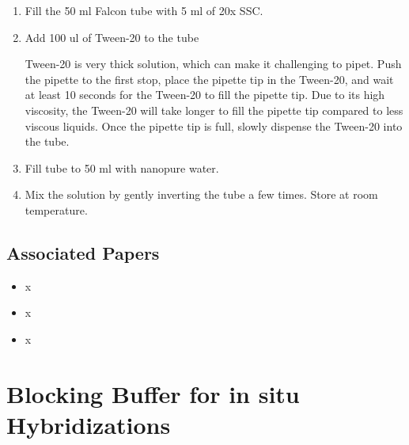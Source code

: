 \documentclass[
  letterpaper,
  DIV=11,
  numbers=noendperiod]{scrreprt}
\providecommand{\tightlist}{%
  \setlength{\itemsep}{0pt}\setlength{\parskip}{0pt}}\usepackage{longtable,booktabs,array}
\begin{document}
\begin{enumerate}
\def\labelenumi{\arabic{enumi}.}
\item
  Fill the 50 ml Falcon tube with 5 ml of 20x SSC.
\item
  Add 100 ul of Tween-20 to the tube

  \begin{tcolorbox}[enhanced jigsaw, rightrule=.15mm, title=\textcolor{quarto-callout-important-color}{\faExclamation}\hspace{0.5em}{NOTE}, titlerule=0mm, opacitybacktitle=0.6, toprule=.15mm, bottomrule=.15mm, opacityback=0, left=2mm, colframe=quarto-callout-important-color-frame, breakable, coltitle=black, colback=white, colbacktitle=quarto-callout-important-color!10!white, bottomtitle=1mm, leftrule=.75mm, toptitle=1mm, arc=.35mm]

  Tween-20 is very thick solution, which can make it challenging to
  pipet. Push the pipette to the first stop, place the pipette tip in
  the Tween-20, and wait at least 10 seconds for the Tween-20 to fill
  the pipette tip. Due to its high viscosity, the Tween-20 will take
  longer to fill the pipette tip compared to less viscous liquids. Once
  the pipette tip is full, slowly dispense the Tween-20 into the tube.

  \end{tcolorbox}
\item
  Fill tube to 50 ml with nanopure water.
\item
  Mix the solution by gently inverting the tube a few times. Store at
  room temperature.
\end{enumerate}

\hypertarget{associated-papers-67}{%
\section{Associated Papers}\label{associated-papers-67}}

\begin{itemize}
\tightlist
\item
  x
\item
  x
\item
  x
\end{itemize}

\hypertarget{sec-recipe-blocking_buffer}{%
\chapter{Blocking Buffer for in situ
Hybridizations}\label{sec-recipe-blocking_buffer}}
\end{document}
